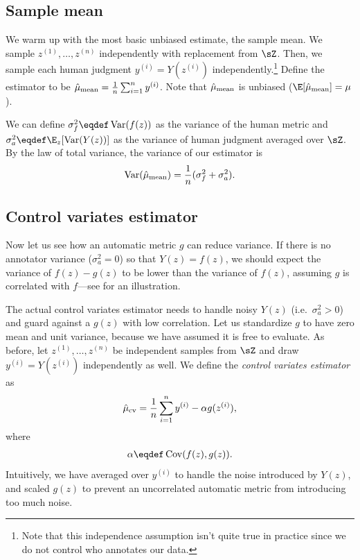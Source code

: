 
\subsection{Sample mean}

We warm up with the most basic unbiased estimate, the sample mean.
We sample $z^{(1)}, \dots, z^{(n)}$ independently with replacement from $\sZ$.
Then, we sample each human judgment $y^{(i)} = Y(z^{(i)})$ independently.\footnote{%
Note that this independence assumption isn't quite true in practice since we do not control who annotates our data.}
Define the estimator to be $\hat \mu_\text{mean} = \frac{1}{n} \sum_{i=1}^n y^{(i)}$.
Note that $\hat \mu_\text{mean}$ is unbiased ($\E[\musimple] = \mu$).

We can define $\sigma^2_f \eqdef \Var(f(z))$ as the variance of the human metric
and $\sigma^2_a \eqdef \E_z[\Var(Y(z))]$ as the variance of human judgment averaged over $\sZ$.
By the law of total variance, the variance of our estimator
is
\begin{align}
\label{eqn:varsimple}
\operatorname{Var}(\hat \mu_\text{mean}) = \frac{1}{n} (\sigma^2_f + \sigma^2_a).
\end{align}

\subsection{Control variates estimator}

Now let us see how an automatic metric $g$ can reduce variance.
If there is no annotator variance ($\sigma^2_a = 0$) so that $Y(z) = f(z)$,
we should expect the variance of $f(z)-g(z)$ to be lower than the variance of
$f(z)$, assuming $g$ is correlated with $f$---see  for an illustration.

The actual control variates estimator needs to
handle noisy $Y(z)$ (i.e.\ $\sigma^2_a > 0$) and
guard against a $g(z)$ with low correlation.
Let us standardize $g$ to have zero mean and unit variance, because we have
assumed it is free to evaluate.
As before, let $z^{(1)}, \dots, z^{(n)}$ be independent samples from $\sZ$ and
draw $y^{(i)} = Y(z^{(i)})$ independently as well.
We define the \emph{control variates estimator} as
\begin{align}
\hat \mu_\text{cv} = \frac{1}{n} \sum_{i=1}^n y^{(i)} - \alpha g(z^{(i)}),
\end{align}
where
\begin{align}
  \alpha \eqdef \Cov(f(z),g(z)).
\end{align}
Intuitively, we have averaged over $y^{(i)}$ to handle the noise introduced by $Y(z)$, and scaled $g(z)$ to prevent an uncorrelated automatic metric from introducing too much noise.


